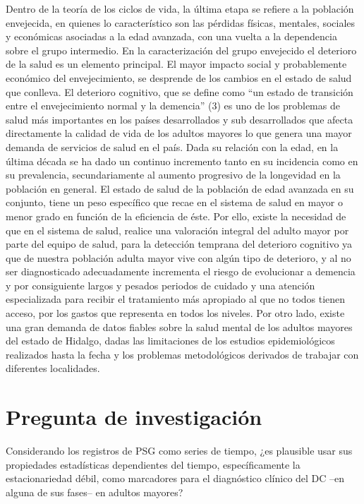 Dentro de la teoría de los ciclos de vida, la última etapa se refiere a la población envejecida, en quienes lo característico son las pérdidas físicas, mentales, sociales y económicas asociadas a la edad avanzada, con una vuelta a la dependencia sobre el grupo intermedio. En la caracterización del grupo envejecido el deterioro de la salud es un elemento principal. 
El mayor impacto social y probablemente económico del envejecimiento, se desprende de los cambios en el estado de salud que conlleva.
El deterioro cognitivo, que se define como “un estado de transición entre el envejecimiento normal y la demencia” (3) es uno de los problemas de salud más importantes en los países desarrollados y sub desarrollados que afecta directamente la calidad de vida de los adultos mayores lo que genera una mayor demanda de servicios de salud en el país.
Dada su relación con la edad, en la última década se ha dado un continuo incremento tanto en su incidencia como en su prevalencia, secundariamente al aumento progresivo de la longevidad en la población en general.
El estado de salud de la población de edad avanzada en su conjunto, tiene un peso específico que recae en el sistema de salud en mayor o menor grado en función de la eficiencia de éste. Por ello, existe la necesidad de que en el sistema de salud, realice una valoración integral del adulto mayor por parte del equipo de salud, para la detección temprana del deterioro cognitivo ya que  de nuestra población adulta mayor vive con algún tipo de deterioro, y al no ser diagnosticado adecuadamente incrementa el riesgo de evolucionar a demencia y por consiguiente largos y pesados periodos de cuidado y una atención especializada para recibir el tratamiento más apropiado al que no todos tienen acceso, por los gastos que representa en todos los niveles. Por otro lado, existe una gran demanda de datos fiables sobre la salud mental de los adultos mayores del estado de Hidalgo, dadas las limitaciones de los estudios epidemiológicos realizados hasta la fecha y los problemas metodológicos derivados de trabajar con diferentes localidades.


\section{Pregunta de investigaci\'on}

Considerando los registros de PSG como series de tiempo,
¿es plausible usar sus propiedades estad\'isticas dependientes del tiempo, espec\'ificamente
la estacionariedad d\'ebil,
como marcadores para el diagn\'ostico cl\'inico del DC --en alguna de 
sus fases-- en adultos mayores?

